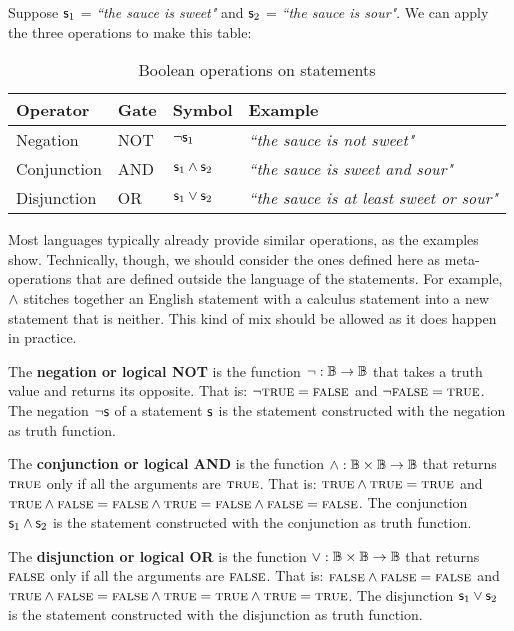 \documentclass[11pt,letterpaper,fleqn]{memoir} %
\begin{document}
Suppose $\mathsf{s}_1$ = \emph{``the sauce is sweet"} and $\mathsf{s}_2$ = \emph{``the sauce is sour"}. We can apply the three operations to make this table:

\begin{table}[h]
	\centering
	\begin{tabular}{p{} p{} p{} p{}}
		Operator & Gate & Symbol & Example \\ 
		\hline 
		Negation & NOT & $\neg \mathsf{s}_1$ &  \emph{``the sauce is not sweet"} \\ 
		Conjunction & AND & $\mathsf{s}_1 \wedge \mathsf{s}_2$ & \emph{``the sauce is sweet and sour"} \\ 
		Disjunction & OR & $\mathsf{s}_1 \vee \mathsf{s}_2$ & \emph{``the sauce is at least sweet or sour"}
	\end{tabular} 
	\caption{Boolean operations on statements}
\end{table}

Most languages typically already provide similar operations, as the examples show. Technically, though, we should consider the ones defined here as meta-operations that are defined outside the language of the statements. For example, $\wedge$ stitches together an English statement with a calculus statement into a new statement that is neither. This kind of mix should be allowed as it does happen in practice.

\begin{mathSection}
	\begin{defn}
		The \textbf{negation or logical NOT} is the function $\neg : \mathbb{B} \to \mathbb{B}$ that takes a truth value and returns its opposite. That is: $\neg \textsc{true} = \textsc{false}$ and $\neg \textsc{false} = \textsc{true}$. The negation $\neg \mathsf{s}$ of a statement $\mathsf{s}$ is the statement constructed with the negation as truth function.
	\end{defn}
	
	\begin{defn}
		The \textbf{conjunction or logical AND} is the function $\wedge : \mathbb{B} \times \mathbb{B} \to \mathbb{B}$ that returns $\textsc{true}$ only if all the arguments are $\textsc{true}$. That is: $\textsc{true} \wedge \textsc{true} = \textsc{true}$ and $\textsc{true} \wedge \textsc{false} =\textsc{false} \wedge \textsc{true} =\textsc{false} \wedge \textsc{false} = \textsc{false}$. The conjunction $\mathsf{s}_1 \wedge \mathsf{s}_2$ is the statement constructed with the conjunction as truth function.
	\end{defn}
	
	\begin{defn}
		The \textbf{disjunction or logical OR} is the function $\vee : \mathbb{B} \times \mathbb{B} \to \mathbb{B}$ that returns $\textsc{false}$ only if all the arguments are $\textsc{false}$. That is: $\textsc{false} \wedge \textsc{false} = \textsc{false}$ and $\textsc{true} \wedge \textsc{false} =\textsc{false} \wedge \textsc{true} =\textsc{true} \wedge \textsc{true} = \textsc{true}$. The disjunction $\mathsf{s}_1 \vee \mathsf{s}_2$ is the statement constructed with the disjunction as truth function.
	\end{defn}
\end{mathSection}
\end{document}
